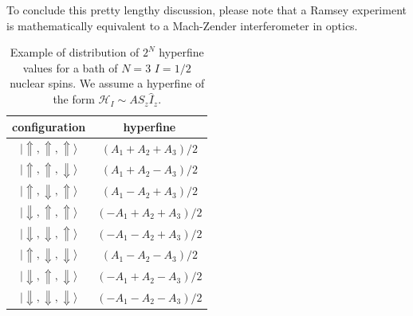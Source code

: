 \documentclass[a4paper,11pt]{article}
\newcommand{\ket}[1]{| #1 \rangle}
\begin{document}
To conclude this pretty lengthy discussion, please note that a Ramsey experiment is mathematically equivalent to a Mach-Zender interferometer in optics.


\begin{table}[h]
\centering
\begin{tabular}{c | c }
configuration & hyperfine \\
\hline
$\ket{\Uparrow,  \Uparrow, \Uparrow}$ & $(A_1+A_2+A_3)/2$ \\
$\ket{\Uparrow,  \Uparrow, \Downarrow}$ & $(A_1+A_2-A_3)/2$ \\
$\ket{\Uparrow,  \Downarrow, \Uparrow}$ & $(A_1-A_2+A_3)/2$ \\
$\ket{\Downarrow,  \Uparrow, \Uparrow}$ & $(-A_1+A_2+A_3)/2$ \\
$\ket{\Downarrow,  \Downarrow, \Uparrow}$ & $(-A_1-A_2+A_3)/2$ \\
$\ket{\Uparrow, \Downarrow, \Downarrow}$ & $(A_1-A_2-A_3)/2$ \\
$\ket{\Downarrow,  \Uparrow, \Downarrow}$ & $(-A_1+A_2-A_3)/2$ \\
$\ket{\Downarrow,  \Downarrow, \Downarrow}$ & $(-A_1-A_2-A_3)/2$ \\
\end{tabular}
\caption{Example of distribution of $2^N$ hyperfine values for a bath of $N=3$ $I=1/2$ nuclear spins. We assume a hyperfine of the form $\mathcal{H}_I \sim A \hat{S}_z \hat{I}_z$.}
\label{tab:hyperfine}
\end{table}
\end{document}
